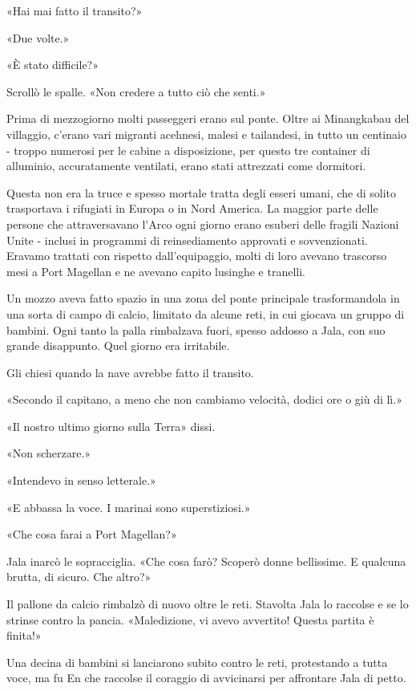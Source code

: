 «Hai mai fatto il transito?»

«Due volte.»

«È stato difficile?»

Scrollò le spalle. «Non credere a tutto ciò che senti.»

Prima di mezzogiorno molti passeggeri erano sul ponte. Oltre ai
Minangkabau del villaggio, c'erano vari migranti acehnesi, malesi e
tailandesi, in tutto un centinaio - troppo numerosi per le cabine a
disposizione, per questo tre container di alluminio, accuratamente
ventilati, erano stati attrezzati come dormitori.

Questa non era la truce e spesso mortale tratta degli esseri umani, che
di solito trasportava i rifugiati in Europa o in Nord America. La
maggior parte delle persone che attraversavano l'Arco ogni giorno erano
esuberi delle fragili Nazioni Unite - inclusi in programmi di
reinsediamento approvati e sovvenzionati. Eravamo trattati con rispetto
dall'equipaggio, molti di loro avevano trascorso mesi a Port Magellan e
ne avevano capito lusinghe e tranelli.

Un mozzo aveva fatto spazio in una zona del ponte principale
trasformandola in una sorta di campo di calcio, limitato da alcune reti,
in cui giocava un gruppo di bambini. Ogni tanto la palla rimbalzava
fuori, spesso addosso a Jala, con suo grande disappunto. Quel giorno era
irritabile.

Gli chiesi quando la nave avrebbe fatto il transito.

«Secondo il capitano, a meno che non cambiamo velocità, dodici ore o giù
di lì.»

«Il nostro ultimo giorno sulla Terra» dissi.

«Non scherzare.»

«Intendevo in senso letterale.»

«E abbassa la voce. I marinai sono superstiziosi.»

«Che cosa farai a Port Magellan?»

Jala inarcò le sopracciglia. «Che cosa farò? Scoperò donne bellissime. E
qualcuna brutta, di sicuro. Che altro?»

Il pallone da calcio rimbalzò di nuovo oltre le reti. Stavolta Jala lo
raccolse e se lo strinse contro la pancia. «Maledizione, vi avevo
avvertito! Questa partita è finita!»

Una decina di bambini si lanciarono subito contro le reti, protestando a
tutta voce, ma fu En che raccolse il coraggio di avvicinarsi per
affrontare Jala di petto.

